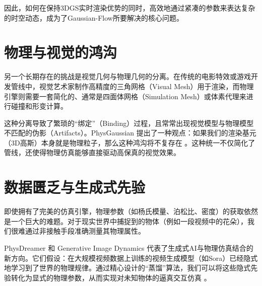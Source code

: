 因此，如何在保持3DGS实时渲染优势的同时，高效地通过紧凑的参数来表达复杂的时空动态，成为了Gaussian-Flow所要解决的核心问题。

\section{物理与视觉的鸿沟}

另一个长期存在的挑战是视觉几何与物理几何的分离。在传统的电影特效或游戏开发管线中，视觉艺术家制作高精度的三角网格（Visual Mesh）用于渲染，而物理引擎则需要一套简化的、通常是四面体网格（Simulation Mesh）或体素代理来进行碰撞和形变计算。

这种分离导致了繁琐的“绑定”（Binding）过程，且常常出现视觉模型与物理模型不匹配的伪影（Artifacts）。PhysGaussian 提出了一种观点：如果我们的渲染基元（3D高斯）本身就是物理粒子，那么这种鸿沟将不复存在 \cite{xie2024physgaussian_cvpr}。这种统一不仅简化了管线，还使得物理仿真能够直接驱动高保真的视觉效果。

\section{数据匮乏与生成式先验}

即使拥有了完美的仿真引擎，物理参数（如杨氏模量、泊松比、密度）的获取依然是一个巨大的难题。对于现实世界中捕捉到的物体（例如一段视频中的花朵），我们很难通过非接触手段准确测量其物理属性。

PhysDreamer 和 Generative Image Dynamics \cite{li2024generative_cvpr} 代表了生成式AI与物理仿真结合的新方向。它们假设：在大规模视频数据上训练的视频生成模型（如Sora）已经隐式地学习到了世界的物理规律。通过精心设计的“蒸馏”算法，我们可以将这些隐式先验转化为显式的物理参数，从而实现对未知物体的逼真交互仿真 \cite{li2024physdreamer_arxiv}。
